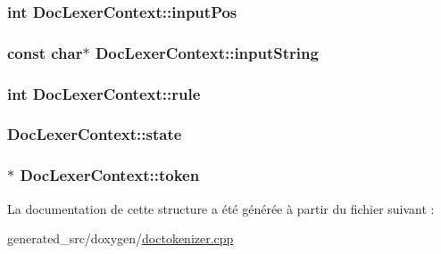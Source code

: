 \subsubsection[{input\+Pos}]{\setlength{\rightskip}{0pt plus 5cm}int Doc\+Lexer\+Context\+::input\+Pos}\label{struct_doc_lexer_context_a427c0399bce8e80117f6133f1fc211e8}
\hypertarget{struct_doc_lexer_context_a2635bb7ec48f95756b72f5ce53d19500}{}
\subsubsection[{input\+String}]{\setlength{\rightskip}{0pt plus 5cm}const char$\ast$ Doc\+Lexer\+Context\+::input\+String}\label{struct_doc_lexer_context_a2635bb7ec48f95756b72f5ce53d19500}
\hypertarget{struct_doc_lexer_context_af2e9a68a5dac05327ccc406c1a8e2669}{}
\subsubsection[{rule}]{\setlength{\rightskip}{0pt plus 5cm}int Doc\+Lexer\+Context\+::rule}\label{struct_doc_lexer_context_af2e9a68a5dac05327ccc406c1a8e2669}
\hypertarget{struct_doc_lexer_context_aff59ac36da3634c543277ef8b5575aca}{}
\subsubsection[{state}]{ Doc\+Lexer\+Context\+::state}\label{struct_doc_lexer_context_aff59ac36da3634c543277ef8b5575aca}
\hypertarget{struct_doc_lexer_context_a0d0279acd580f1391253e0cb4de291d6}{}
\subsubsection[{token}]{$\ast$ Doc\+Lexer\+Context\+::token}\label{struct_doc_lexer_context_a0d0279acd580f1391253e0cb4de291d6}


La documentation de cette structure a été générée à partir du fichier suivant \+:\begin{DoxyCompactItemize}
\item 
generated\+\_\+src/doxygen/\hyperlink{doctokenizer_8cpp}{doctokenizer.\+cpp}\end{DoxyCompactItemize}
